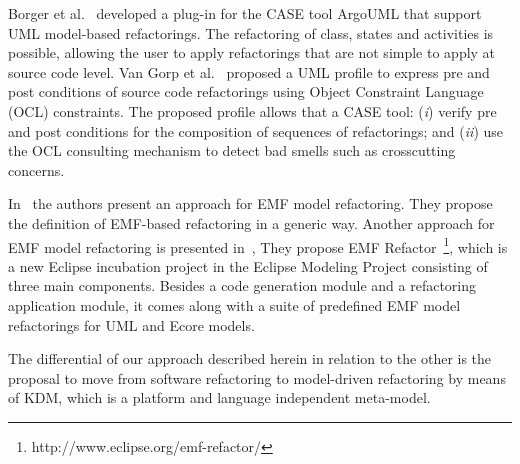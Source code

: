 Borger et al.~\cite{Boger2002} developed a plug-in for the CASE tool ArgoUML that support UML model-based refactorings. The refactoring of class, states and activities is possible, allowing the user to apply refactorings that are not simple to apply at source code level. 
Van Gorp et al.~\cite{Gorp03towardsautomating} proposed a UML profile to express pre and post conditions of source code refactorings using Object Constraint Language (OCL) constraints. The proposed profile allows that a CASE tool: (\textit{i}) verify pre and post conditions for the composition of sequences of refactorings; and (\textit{ii}) use the OCL consulting mechanism to detect bad smells such as crosscutting concerns.

In~\cite{Models2010} the authors present an approach for EMF model refactoring. They propose the definition of EMF-based refactoring in a generic way. Another approach for EMF model refactoring is presented in~\cite{ModelsEMFREfactorin}, They propose EMF Refactor~\footnote{http://www.eclipse.org/emf-refactor/}, which is a new Eclipse incubation project in the Eclipse Modeling Project consisting of three main components. Besides a code generation module and a refactoring application module, it comes along with a suite of predefined EMF model refactorings for UML and Ecore models.

The differential of our approach described herein in relation to the other is the proposal to move from software refactoring to model-driven refactoring by means of KDM, which is a platform and language independent meta-model.
